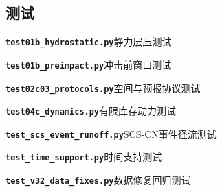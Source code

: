 \subsection*{测试}
\noindent\textbf{\texttt{test01b\_hydrostatic.py}}\quad 静力层压测试\par\nopagebreak

\noindent\textbf{\texttt{test01b\_preimpact.py}}\quad 冲击前窗口测试\par\nopagebreak

\noindent\textbf{\texttt{test02c03\_protocols.py}}\quad 空间与预报协议测试\par\nopagebreak

\noindent\textbf{\texttt{test04c\_dynamics.py}}\quad 有限库存动力测试\par\nopagebreak

\noindent\textbf{\texttt{test\_scs\_event\_runoff.py}}\quad SCS-CN事件径流测试\par\nopagebreak

\noindent\textbf{\texttt{test\_time\_support.py}}\quad 时间支持测试\par\nopagebreak

\noindent\textbf{\texttt{test\_v32\_data\_fixes.py}}\quad 数据修复回归测试\par\nopagebreak

